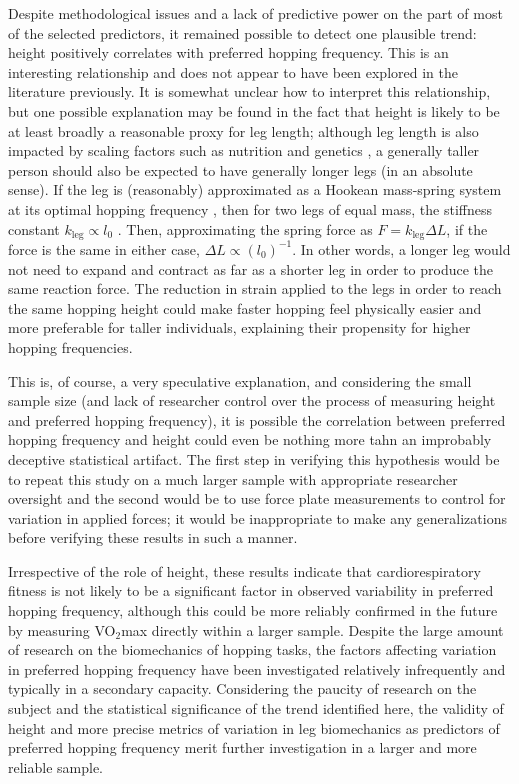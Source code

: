 \documentclass{article}
\begin{document}
Despite methodological issues and a lack of predictive power on the part of most of the selected predictors, it remained possible to detect one plausible trend: height positively correlates with preferred hopping frequency. This is an interesting relationship and does not appear to have been explored in the literature previously. It is somewhat unclear how to interpret this relationship, but one possible explanation may be found in the fact that height is likely to be at least broadly a reasonable proxy for leg length; although leg length is also impacted by scaling factors such as nutrition and genetics \parencite{bogin2010}, a generally taller person should also be expected to have generally longer legs (in an absolute sense). If the leg is (reasonably) approximated as a Hookean mass-spring system at its optimal hopping frequency \parencite{blickhan1989}, then for two legs of equal mass, the stiffness constant $k_\textrm{leg} \propto l_0$ \parencite{farley1993,mcmahon1990}. Then, approximating the spring force as $F = k_\textrm{leg}\Delta L$, if the force is the same in either case, $\Delta L \propto (l_0)^{-1}$. In other words, a longer leg would not need to expand and contract as far as a shorter leg in order to produce the same reaction force. The reduction in strain applied to the legs in order to reach the same hopping height could make faster hopping feel physically easier and more preferable for taller individuals, explaining their propensity for higher hopping frequencies. 

This is, of course, a very speculative explanation, and considering the small sample size (and lack of researcher control over the process of measuring height and preferred hopping frequency), it is possible the correlation between preferred hopping frequency and height could even be nothing more tahn an improbably deceptive statistical artifact. The first step in verifying this hypothesis would be to repeat this study on a much larger sample with appropriate researcher oversight and the second would be to use force plate measurements to control for variation in applied forces; it would be inappropriate to make any generalizations before verifying these results in such a manner. 

Irrespective of the role of height, these results indicate that cardiorespiratory fitness is not likely to be a significant factor in observed variability in preferred hopping frequency, although this could be more reliably confirmed in the future by measuring VO$_2$max directly within a larger sample. Despite the large amount of research on the biomechanics of hopping tasks, the factors affecting variation in preferred hopping frequency have been investigated relatively infrequently and typically in a secondary capacity. Considering the paucity of research on the subject and the statistical significance of the trend identified here, the validity of height and more precise metrics of variation in leg biomechanics as predictors of preferred hopping frequency merit further investigation in a larger and more reliable sample. 
\end{document}
